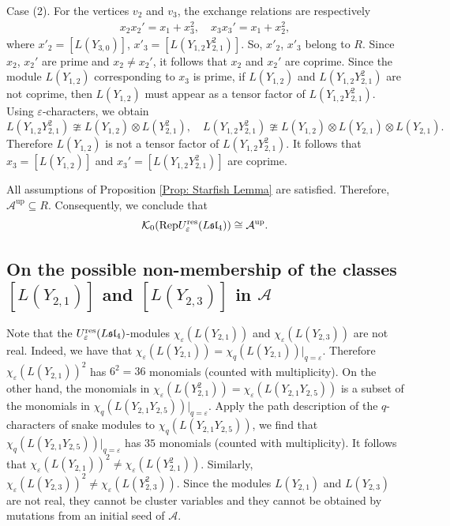 \documentclass[11pt, reqno]{amsart}
\theoremstyle{plain}
\theoremstyle{definition}
\numberwithin{equation}{section}
\newcommand{\res}{{\rm res}}
\newcommand{\Rep}{{\rm Rep}}
\begin{document}
Case (2). For the vertices $v_2$ and $v_3$, the exchange relations are respectively
\begin{align*}
x_2x_2' = x_1 + x_3^2,\quad
x_3x_3' = x_1 + x_2^2,
\end{align*}
where $x'_2=[L(Y_{3,0})]$, $x'_3=[L(Y_{1,2}Y^2_{2,1})]$. So, $x'_2$, $x'_3$ belong to $R$. Since $x_2$, $x_2'$ are prime and $x_2 \ne x_2'$, it follows that $x_2$ and $x_2'$ are coprime. Since the module $L(Y_{1,2})$ corresponding to $x_3$ is prime, if $L(Y_{1,2})$ and $L(Y_{1,2}Y_{2,1}^2)$ are not coprime, then $L(Y_{1,2})$ must appear as a tensor factor of $L(Y_{1,2}Y_{2,1}^2)$. Using $\varepsilon$-characters, we obtain
\[
L(Y_{1,2}Y_{2,1}^2) \ncong L(Y_{1,2}) \otimes L(Y_{2,1}^2),\quad
L(Y_{1,2}Y_{2,1}^2) \ncong L(Y_{1,2}) \otimes L(Y_{2,1}) \otimes L(Y_{2,1}).
\]
Therefore $L(Y_{1,2})$ is not a tensor factor of $L(Y_{1,2}Y_{2,1}^2)$. It follows that $x_3=[L(Y_{1,2})]$ and $x_3'=[L(Y_{1,2}Y_{2,1}^2)]$ are coprime. 

All assumptions of Proposition \ref{Prop: Starfish Lemma} are satisfied. Therefore, $\mathcal{A}^{\mathrm{up}} \subseteq R$. Consequently, we conclude that
\[
\mathcal{K}_0(\Rep U_{\varepsilon}^{\res}(L\mathfrak{sl}_4)) \cong \mathcal{A}^{\mathrm{up}}.
\]

\subsection{\texorpdfstring{On the possible non-membership of the classes 
$[L(Y_{2,1})]$ and $[L(Y_{2,3})]$ in $\mathcal{A}$ }{On the possible non-membership of [L(Y{2,1})] and [L(Y{2,3})] in A}}
Note that the $U_{\varepsilon}^{\res}(L\mathfrak{sl}_4)$-modules $\chi_\varepsilon(L(Y_{2,1}))$ and $\chi_\varepsilon(L(Y_{2,3}))$ are not real. Indeed, we have that $\chi_\varepsilon(L(Y_{2,1})) = \chi_q(L(Y_{2,1}))|_{q=\varepsilon}$. Therefore $\chi_\varepsilon(L(Y_{2,1}))^2$ has $6^2=36$ monomials (counted with multiplicity). On the other hand, the monomials in $\chi_\varepsilon(L(Y_{2,1}^2)) = \chi_\varepsilon(L(Y_{2,1}Y_{2,5}))$ is a subset of the monomials in $\chi_q(L(Y_{2,1}Y_{2,5}))|_{q=\varepsilon}$. Apply the path description \cite{MY12} of the $q$-characters of snake modules to $\chi_q(L(Y_{2,1}Y_{2,5}))$, we find that $\chi_q(L(Y_{2,1}Y_{2,5}))|_{q=\varepsilon}$ has $35$ monomials (counted with multiplicity). It follows that $\chi_\varepsilon(L(Y_{2,1}))^2 \ne \chi_\varepsilon(L(Y_{2,1}^2))$. Similarly, $\chi_\varepsilon(L(Y_{2,3}))^2 \ne \chi_\varepsilon(L(Y_{2,3}^2))$. 
Since the modules $L(Y_{2,1})$ and $L(Y_{2,3})$ are not real, they cannot be cluster variables and they cannot be obtained by mutations from an initial seed of $\mathcal{A}$.
\end{document}
